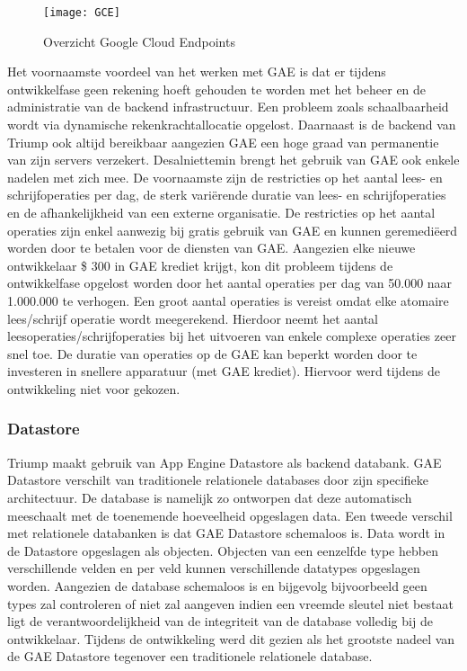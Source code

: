 \begin{figure}[H]
	\centering
	\texttt{[image: GCE]}
	\caption{Overzicht Google Cloud Endpoints}
	\label{fig:Overzicht Google Cloud Endpoints}
\end{figure}

Het voornaamste voordeel van het werken met GAE is dat er tijdens ontwikkelfase geen rekening hoeft gehouden te worden met het  beheer en de administratie van de backend infrastructuur. Een probleem zoals schaalbaarheid wordt via dynamische rekenkrachtallocatie opgelost. Daarnaast is de backend van Triump ook altijd bereikbaar aangezien GAE een hoge graad van permanentie van zijn servers verzekert. Desalniettemin brengt het gebruik van GAE ook enkele nadelen met zich mee. De voornaamste zijn de restricties op het aantal lees- en schrijfoperaties per dag, de sterk variërende duratie van lees- en schrijfoperaties en de afhankelijkheid van een externe organisatie. De restricties op het aantal operaties zijn enkel aanwezig bij gratis gebruik van GAE en kunnen geremediëerd worden door te betalen voor de diensten van GAE.
Aangezien elke nieuwe ontwikkelaar \$ 300 in GAE krediet krijgt, kon dit probleem tijdens de ontwikkelfase opgelost worden door het aantal operaties per dag van 50.000 naar 1.000.000 te verhogen. Een groot aantal operaties is vereist omdat elke atomaire lees/schrijf operatie wordt meegerekend. Hierdoor neemt het aantal leesoperaties/schrijfoperaties bij het uitvoeren van enkele complexe operaties zeer snel toe. De duratie van operaties op de GAE kan beperkt worden door te investeren in snellere apparatuur (met GAE krediet). Hiervoor werd tijdens de ontwikkeling niet voor gekozen.

\subsubsection{Datastore~\cite{Google_Datastore}}

Triump maakt gebruik van App Engine Datastore als backend databank. GAE Datastore verschilt van traditionele relationele databases door zijn specifieke architectuur. De database is namelijk zo ontworpen dat deze automatisch meeschaalt met de toenemende hoeveelheid opgeslagen data. Een tweede verschil met relationele databanken is dat GAE Datastore schemaloos is. Data wordt in de Datastore opgeslagen als objecten. Objecten van een eenzelfde type hebben verschillende velden en per veld kunnen verschillende datatypes opgeslagen worden.
Aangezien de database schemaloos is en bijgevolg bijvoorbeeld geen types zal controleren of niet zal aangeven indien een vreemde sleutel niet bestaat ligt de verantwoordelijkheid van de integriteit van de database volledig bij de ontwikkelaar. Tijdens de ontwikkeling werd dit gezien als het grootste nadeel van de GAE Datastore tegenover een traditionele relationele database.

